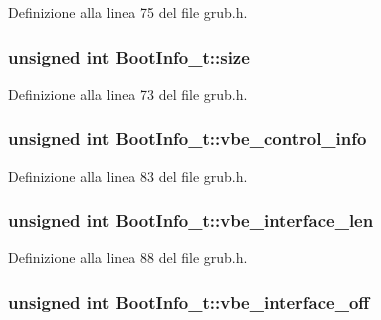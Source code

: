 Definizione alla linea 75 del file grub.\+h.

\hypertarget{structBootInfo__t_a761344d9a2bf10e1551dca7bd77f90cf}{
\subsubsection[{size}]{\setlength{\rightskip}{0pt plus 5cm}unsigned int Boot\+Info\+\_\+t\+::size}}\label{structBootInfo__t_a761344d9a2bf10e1551dca7bd77f90cf}


Definizione alla linea 73 del file grub.\+h.

\hypertarget{structBootInfo__t_a8a09488fd20d514ccd02e07e5ca45d6d}{
\subsubsection[{vbe\+\_\+control\+\_\+info}]{\setlength{\rightskip}{0pt plus 5cm}unsigned int Boot\+Info\+\_\+t\+::vbe\+\_\+control\+\_\+info}}\label{structBootInfo__t_a8a09488fd20d514ccd02e07e5ca45d6d}


Definizione alla linea 83 del file grub.\+h.

\hypertarget{structBootInfo__t_a47ae9ab2b4242be9be167ea095956097}{
\subsubsection[{vbe\+\_\+interface\+\_\+len}]{\setlength{\rightskip}{0pt plus 5cm}unsigned int Boot\+Info\+\_\+t\+::vbe\+\_\+interface\+\_\+len}}\label{structBootInfo__t_a47ae9ab2b4242be9be167ea095956097}


Definizione alla linea 88 del file grub.\+h.

\hypertarget{structBootInfo__t_a2359d311e9a6d45dcebb8e6fae1a1f63}{
\subsubsection[{vbe\+\_\+interface\+\_\+off}]{\setlength{\rightskip}{0pt plus 5cm}unsigned int Boot\+Info\+\_\+t\+::vbe\+\_\+interface\+\_\+off}}\label{structBootInfo__t_a2359d311e9a6d45dcebb8e6fae1a1f63}


